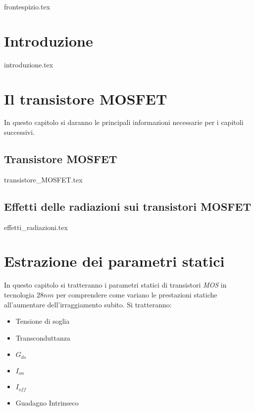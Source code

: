 \documentclass[
	a4paper,
	cleardoublepage=empty,
	headings=twolinechapter,
	numbers=autoenddot,
]{scrbook}
\begin{document}
\frontmatter

{frontespizio.tex}

\tableofcontents

\chapter*{Introduzione}
{introduzione.tex}

\mainmatter

\chapter{Il transistore MOSFET}
In questo capitolo si daranno le principali informazioni necessarie per i capitoli successivi.
\section{Transistore MOSFET}
{transistore_MOSFET.tex}

\section{Effetti delle radiazioni sui transistori MOSFET}
{effetti_radiazioni.tex}


\chapter{Estrazione dei parametri statici}
In questo capitolo si tratteranno i parametri statici di transistori \emph{MOS} in tecnologia $28 nm$ per comprendere come variano le prestazioni statiche all'aumentare dell'irraggiamento subito. Si tratteranno:
\begin{itemize}
  \item Tensione di soglia
  \item Transconduttanza
  \item $G_{ds}$
  \item $I_{on}$
  \item $I_{off}$
  \item Guadagno Intrinseco
\end{itemize}
\end{document}
